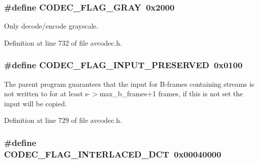 \subsubsection[{\texorpdfstring{C\+O\+D\+E\+C\+\_\+\+F\+L\+A\+G\+\_\+\+G\+R\+AY}{CODEC_FLAG_GRAY}}]{\setlength{\rightskip}{0pt plus 5cm}\#define C\+O\+D\+E\+C\+\_\+\+F\+L\+A\+G\+\_\+\+G\+R\+AY~0x2000}\hypertarget{group__lavc__core_gad97799a4d0af42bdb6dc92a712893f44}{}\label{group__lavc__core_gad97799a4d0af42bdb6dc92a712893f44}


Only decode/encode grayscale. 



Definition at line 732 of file avcodec.\+h.

\subsubsection[{\texorpdfstring{C\+O\+D\+E\+C\+\_\+\+F\+L\+A\+G\+\_\+\+I\+N\+P\+U\+T\+\_\+\+P\+R\+E\+S\+E\+R\+V\+ED}{CODEC_FLAG_INPUT_PRESERVED}}]{\setlength{\rightskip}{0pt plus 5cm}\#define C\+O\+D\+E\+C\+\_\+\+F\+L\+A\+G\+\_\+\+I\+N\+P\+U\+T\+\_\+\+P\+R\+E\+S\+E\+R\+V\+ED~0x0100}\hypertarget{group__lavc__core_ga953f1b45980492ebac2caee244b4ffb9}{}\label{group__lavc__core_ga953f1b45980492ebac2caee244b4ffb9}
The parent program guarantees that the input for B-\/frames containing streams is not written to for at least s-\/$>$max\+\_\+b\+\_\+frames+1 frames, if this is not set the input will be copied. 

Definition at line 729 of file avcodec.\+h.

\subsubsection[{\texorpdfstring{C\+O\+D\+E\+C\+\_\+\+F\+L\+A\+G\+\_\+\+I\+N\+T\+E\+R\+L\+A\+C\+E\+D\+\_\+\+D\+CT}{CODEC_FLAG_INTERLACED_DCT}}]{\setlength{\rightskip}{0pt plus 5cm}\#define C\+O\+D\+E\+C\+\_\+\+F\+L\+A\+G\+\_\+\+I\+N\+T\+E\+R\+L\+A\+C\+E\+D\+\_\+\+D\+CT~0x00040000}\hypertarget{group__lavc__core_gac0bec0a9872e168e875889d06e3b9745}{}\label{group__lavc__core_gac0bec0a9872e168e875889d06e3b9745}


